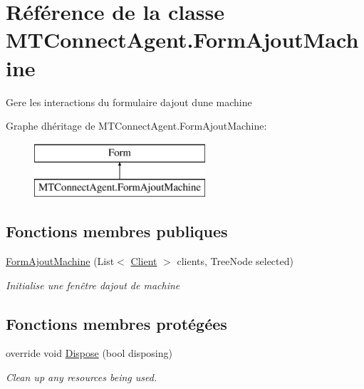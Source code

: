 \hypertarget{class_m_t_connect_agent_1_1_form_ajout_machine}{}\section{Référence de la classe M\+T\+Connect\+Agent.\+Form\+Ajout\+Machine}
\label{class_m_t_connect_agent_1_1_form_ajout_machine}


Gere les interactions du formulaire d\textquotesingle{}ajout d\textquotesingle{}une machine  


Graphe d\textquotesingle{}héritage de M\+T\+Connect\+Agent.\+Form\+Ajout\+Machine\+:\begin{figure}[H]
\begin{center}
\leavevmode
\includegraphics[height=2.000000cm]{class_m_t_connect_agent_1_1_form_ajout_machine}
\end{center}
\end{figure}
\subsection*{Fonctions membres publiques}
\begin{DoxyCompactItemize}
\item 
\mbox{\hyperlink{class_m_t_connect_agent_1_1_form_ajout_machine_acabb6332771d87cf6d8538abd9416de8}{Form\+Ajout\+Machine}} (List$<$ \mbox{\hyperlink{class_m_t_connect_agent_1_1_model_1_1_client}{Client}} $>$ clients, Tree\+Node selected)
\begin{DoxyCompactList}\small\item\em Initialise une fenêtre d\textquotesingle{}ajout de machine \end{DoxyCompactList}\end{DoxyCompactItemize}
\subsection*{Fonctions membres protégées}
\begin{DoxyCompactItemize}
\item 
override void \mbox{\hyperlink{class_m_t_connect_agent_1_1_form_ajout_machine_a281c5466b5ca2d5daea6fc4280955969}{Dispose}} (bool disposing)
\begin{DoxyCompactList}\small\item\em Clean up any resources being used. \end{DoxyCompactList}\end{DoxyCompactItemize}
